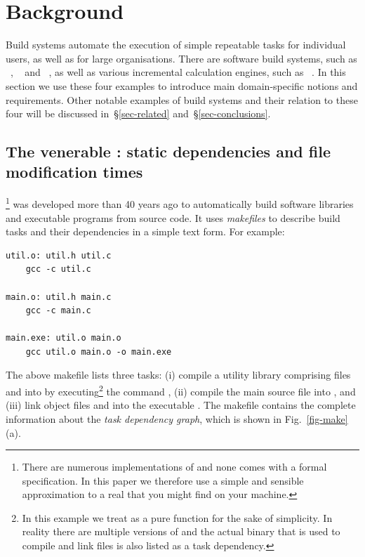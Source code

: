 \clearpage
\section{Background}\label{sec-background}

Build systems automate the execution of simple repeatable tasks for individual
users, as well as for large organisations. There are software build systems,
such as \Make~\cite{feldman1979make}, \Shake~\cite{mitchell2012shake} and
\Bazel~\cite{bazel}, as well as various incremental calculation engines, such
as \Excel~\cite{advanced_excel}. In this section we use these four examples to
introduce main domain-specific notions and requirements. Other notable examples
of build systems and their relation to these four will be discussed
in~\S\ref{sec-related} and~\S\ref{sec-conclusions}.

\subsection{The venerable \Make: static dependencies and file modification times}
\label{sec-background-make}

\Make\footnote{There are numerous implementations of \Make and none comes with a
formal specification. In this paper we therefore use a simple and sensible
approximation to a real \Make that you might find on your machine.} was developed
more than 40 years ago to automatically build software libraries and executable
programs from source code. It uses \emph{makefiles} to describe build tasks and
their dependencies in a simple text form. For example:

\vspace{1mm}
\begin{verbatim}
util.o: util.h util.c
    gcc -c util.c

main.o: util.h main.c
    gcc -c main.c

main.exe: util.o main.o
    gcc util.o main.o -o main.exe
\end{verbatim}
\vspace{1mm}

\noindent
The above makefile lists three tasks: (i) compile a utility library comprising
files  and  into  by
executing\footnote{In this example we treat  as a pure function for the
sake of simplicity. In reality there are multiple versions of  and the
actual binary that is used to compile and link files is also listed as a task
dependency.} the command , (ii) compile the main source file
 into , and (iii) link object files  and
 into the executable . The makefile contains the
complete information about the \emph{task dependency graph}, which is shown in
Fig.~\ref{fig-make}(a).

